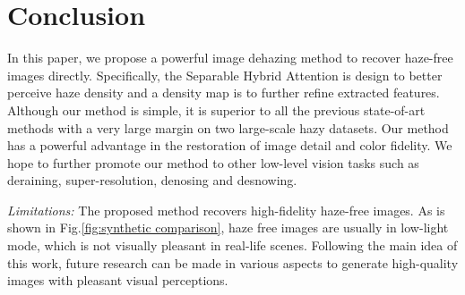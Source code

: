 \documentclass[final]{cvpr}
\begin{document}
\section{Conclusion}
In this paper, we propose a powerful image dehazing method to recover haze-free images directly. Specifically, the Separable Hybrid Attention is design to better perceive haze density and a density map is to further refine extracted features. Although our method is simple, it is superior to all the previous state-of-art methods with a very large margin on two large-scale hazy datasets. Our method has a powerful advantage in the restoration of image detail and color fidelity. We hope to further promote our method to other low-level vision tasks such as deraining, super-resolution, denosing and desnowing.

\textit{Limitations:} The proposed method recovers high-fidelity haze-free images. As is shown in Fig.\ref{fig:synthetic comparison}, haze free images are usually in low-light mode, which is not visually pleasant in real-life scenes. Following the main idea of this work, future research can be made in various aspects to generate high-quality images with pleasant visual perceptions.


{\small


}
\end{document}
